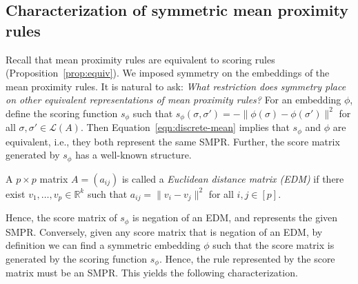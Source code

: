 \documentclass[prodmode,acmec]{ec-acmsmall}
\newcommand{\calL}{{\mathcal{L}}}
\newcommand{\rank}{{\calL(A)}}
\begin{document}
%




\subsection{Characterization of symmetric mean proximity rules}
\label{sec:smpr-char}

Recall that mean proximity rules are equivalent to scoring rules (Proposition~\ref{prop:equiv}). We imposed symmetry on the embeddings of the mean proximity rules. It is natural to ask: \emph{What restriction does symmetry place on other equivalent representations of mean proximity rules?} For an embedding $\phi$, define the scoring function $s_{\phi}$ such that $s_{\phi}(\sigma,\sigma') = -\|\phi(\sigma)-\phi(\sigma')\|^2$ for all $\sigma,\sigma' \in \rank$. Then Equation~\eqref{eqn:discrete-mean} implies that $s_{\phi}$ and $\phi$ are equivalent, i.e., they both represent the same SMPR. Further, the score matrix generated by $s_{\phi}$ has a well-known structure.


\begin{definition}
A $p \times p$ matrix $A = (a_{ij})$ is called a \emph{Euclidean distance matrix (EDM)} if there exist $v_1,\ldots,v_p \in \mathbb{R}^k$ such that $a_{ij} = \|v_i-v_j\|^2$ for all $i,j \in [p]$. 
\end{definition}

Hence, the score matrix of $s_{\phi}$ is negation of an EDM, and represents the given SMPR.  Conversely, given any score matrix that is negation of an EDM, by definition we can find a symmetric embedding $\phi$ such that the score matrix is generated by the scoring function $s_{\phi}$. Hence, the rule represented by the score matrix must be an SMPR. This yields the following characterization. 
\end{document}
